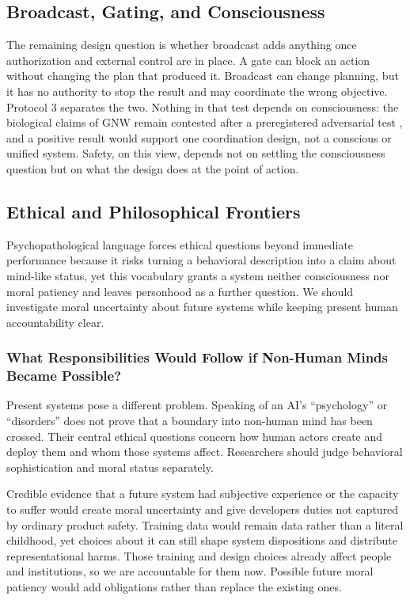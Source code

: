 \documentclass{article}
\begin{document}
\subsection{Broadcast, Gating, and Consciousness}
The remaining design question is whether broadcast adds anything once authorization and external control are in place. A gate can block an action without changing the plan that produced it. Broadcast can change planning, but it has no authority to stop the result and may coordinate the wrong objective. Protocol 3 separates the two. Nothing in that test depends on consciousness: the biological claims of GNW remain contested after a preregistered adversarial test \citep{ref69}, and a positive result would support one coordination design, not a conscious or unified system. Safety, on this view, depends not on settling the consciousness question but on what the design does at the point of action.
\subsection{Ethical and Philosophical Frontiers}
Psychopathological language forces ethical questions beyond immediate performance because it risks turning a behavioral description into a claim about mind-like status, yet this vocabulary grants a system neither consciousness nor moral patiency and leaves personhood as a further question. We should investigate moral uncertainty about future systems while keeping present human accountability clear.

\subsubsection{What Responsibilities Would Follow if Non-Human Minds Became Possible?}
Present systems pose a different problem. Speaking of an AI's ``psychology'' or ``disorders'' does not prove that a boundary into non-human mind has been crossed. Their central ethical questions concern how human actors create and deploy them and whom those systems affect. Researchers should judge behavioral sophistication and moral status separately.

Credible evidence that a future system had subjective experience or the capacity to suffer would create moral uncertainty and give developers duties not captured by ordinary product safety. Training data would remain data rather than a literal childhood, yet choices about it can still shape system dispositions and distribute representational harms. Those training and design choices already affect people and institutions, so we are accountable for them now. Possible future moral patiency would add obligations rather than replace the existing ones.
\end{document}
